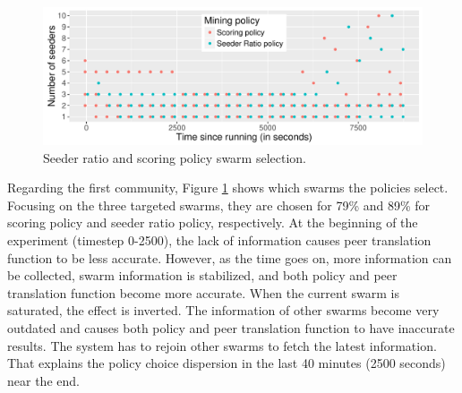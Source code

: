 \label{section:chooseswarmexp}
\begin{figure}[h]
	\centering
	\includegraphics[width=\textwidth]{pics/results/scsr_notrig_scatter.pdf}
	\caption{Seeder ratio and scoring policy swarm selection.}
	\label{fig:scatterscsrnotrig}
\end{figure}

Regarding the first community, Figure \ref{fig:scatterscsrnotrig} shows which swarms the policies select. Focusing on the three targeted swarms, they are chosen for 79\% and 89\% for scoring policy and seeder ratio policy, respectively. At the beginning of the experiment (timestep 0-2500), the lack of information causes peer translation function to be less accurate. However, as the time goes on, more information can be collected, swarm information is stabilized, and both policy and peer translation function become more accurate. When the current swarm is saturated, the effect is inverted. The information of other swarms become very outdated and causes both policy and peer translation function to have inaccurate results. The system has to rejoin other swarms to fetch the latest information. That explains the policy choice dispersion in the last 40 minutes (2500 seconds) near the end. 

